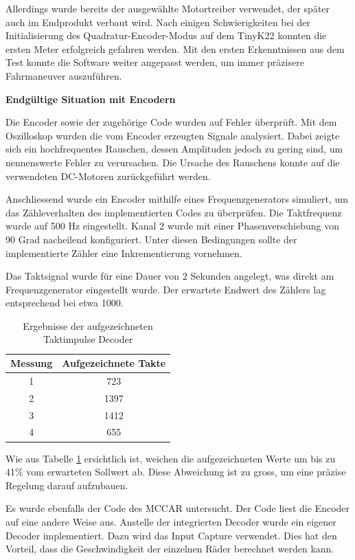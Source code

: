 Allerdings wurde bereits der ausgewählte Motortreiber verwendet, der später auch im Endprodukt verbaut wird. Nach einigen Schwierigkeiten bei der Initialisierung des Quadratur-Encoder-Modus auf dem TinyK22 konnten die ersten Meter erfolgreich gefahren werden. Mit den ersten Erkenntnissen aus dem Test konnte die Software weiter angepasst werden, um immer präzisere Fahrmaneuver auszuführen.

\textbf{Endgültige Situation mit Encodern}

Die Encoder sowie der zugehörige Code wurden auf Fehler überprüft. Mit dem Oszilloskop wurden die vom Encoder erzeugten Signale analysiert. Dabei zeigte sich ein hochfrequentes Rauschen, dessen Amplituden jedoch zu gering sind, um nennenswerte Fehler zu verursachen. Die Ursache des Rauschens konnte auf die verwendeten DC-Motoren zurückgeführt werden.

Anschliessend wurde ein Encoder mithilfe eines Frequenzgenerators simuliert, um das Zähleverhalten des implementierten Codes zu überprüfen. Die Taktfrequenz wurde auf 500 Hz eingestellt. Kanal 2 wurde mit einer Phasenverschiebung von 90 Grad nacheilend konfiguriert. Unter diesen Bedingungen sollte der implementierte Zähler eine Inkrementierung vornehmen.

Das Taktsignal wurde für eine Dauer von 2 Sekunden angelegt, was direkt am Frequenzgenerator eingestellt wurde. Der erwartete Endwert des Zählers lag entsprechend bei etwa 1000.

\begin{table}[ht]
\centering
\caption{Ergebnisse der aufgezeichneten Taktimpulse Decoder}
\label{tab:taktergebnisse_de}
\begin{tabular}{|c|c|}
\hline
\textbf{Messung} & \textbf{Aufgezeichnete Takte} \\
\hline
1 & 723 \\
2 & 1397 \\
3 & 1412 \\
4 & 655 \\
\hline
\end{tabular}
\end{table}

Wie aus Tabelle \ref{tab:taktergebnisse_de} ersichtlich ist, weichen die aufgezeichneten Werte um bis zu 41\% vom erwarteten Sollwert ab. Diese Abweichung ist zu gross, um eine präzise Regelung darauf aufzubauen.

Es wurde ebenfalls der Code des MCCAR untersucht. Der Code liest die Encoder auf eine andere Weise aus. Anstelle der integrierten Decoder wurde ein eigener Decoder implementiert. Dazu wird das Input Capture verwendet. Dies hat den Vorteil, dass die Geschwindigkeit der einzelnen Räder berechnet werden kann.

